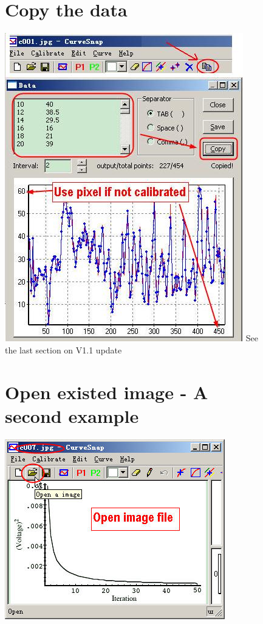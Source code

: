 \documentclass[12pt]{article}
\begin{document}
\begin{figure}[ht!]
\section{Copy the data}
  \center \includegraphics{./tut_files/05_copy_data.jpg}
  See the last section on V1.1 update
\end{figure}

\begin{figure}[ht!]
\section{Open existed image - A second example}
  \center \includegraphics{./tut_files/06_open_image_file.jpg}
\end{figure}
\end{document}
